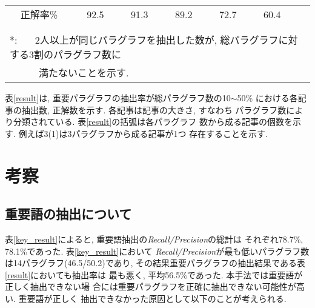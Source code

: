 {\begin{table}[htbp]
\begin{center}
\begin{tabular}{|c|r|r|r|r|r|r|r|r|r|r|r|}
\multicolumn{1}{|c|}{正解率\%} &\multicolumn{2}{c|}{92.5}  &\multicolumn{2}{c|}{91.3}  &\multicolumn{2}{c|}{89.2}  &\multicolumn{2}{c|}{72.7}  &\multicolumn{2}{c|}{60.4}  \\ \cline{1-11}
\multicolumn{12}{c}{} \\
\multicolumn{12}{c}{} \\
\multicolumn{12}{l}{$\ast$: \ \ \ 2人以上が同じパラグラフを抽出した数が, 総パラグラフに対する3割のパラグラフ数に} \\
\multicolumn{12}{l}{ \ \ \ \ \ \ 満たないことを示す.} \\
\end{tabular}
\end{center}
\end{table}
}


\noindent
表\ref{result}は, 重要パラグラフの抽出率が総パラグラフ数の10$\sim$50\%
における各記事の抽出数, 正解数を示す.  各記事は記事の大きさ, すなわち
パラグラフ数により分類されている.  表\ref{result}の括弧は各パラグラフ
数から成る記事の個数を示す.  例えば3(1)は3パラグラフから成る記事が1つ
存在することを示す. 




\section{考察}

\subsection{重要語の抽出について}




表\ref{key_result}によると, 重要語抽出の{\it Recall/Precision}の総計は
それぞれ78.7\%, 78.1\%であった.  表\ref{key_result}において{\it
Recall/Precision}が最も低いパラグラフ数は14パラグラフ(46.5/50.2)であり, 
その結果重要パラグラフの抽出結果である表\ref{result}においても抽出率は
最も悪く, 平均56.5\%であった.  本手法では重要語が正しく抽出できない場
合には重要パラグラフを正確に抽出できない可能性が高い.  重要語が正しく
抽出できなかった原因として以下のことが考えられる.

